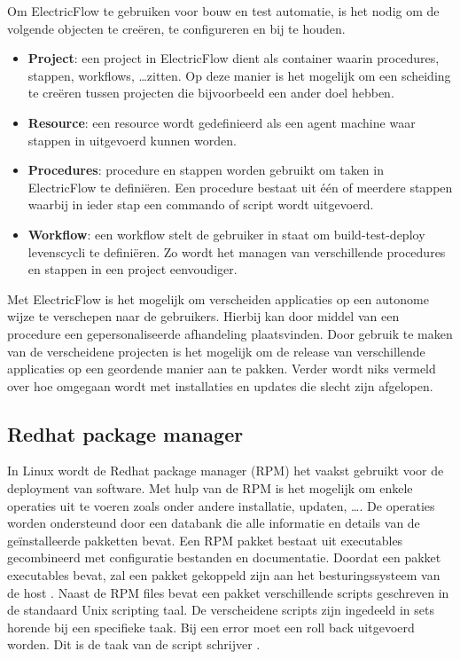 Om ElectricFlow te gebruiken voor bouw en test automatie, is het nodig om de volgende objecten te creëren, te configureren en bij te houden.
\begin{itemize}
\item \textbf{Project}: een project in ElectricFlow dient als container waarin procedures, stappen, workflows, \ldots zitten.
Op deze manier is het mogelijk om een scheiding te creëren tussen projecten die bijvoorbeeld een ander doel hebben.
\item \textbf{Resource}: een resource wordt gedefinieerd als een agent machine waar stappen in uitgevoerd kunnen worden.
\item \textbf{Procedures}: procedure en stappen worden gebruikt om taken in ElectricFlow te definiëren.
Een procedure bestaat uit één of meerdere stappen waarbij in ieder stap een commando of script wordt uitgevoerd.
\item \textbf{Workflow}: een workflow stelt de gebruiker in staat om build-test-deploy levenscycli te definiëren.
Zo wordt het managen van verschillende procedures en stappen in een project eenvoudiger.
\end{itemize}

Met ElectricFlow is het mogelijk om verscheiden applicaties op een autonome wijze te verschepen naar de gebruikers.
Hierbij kan door middel van een procedure een gepersonaliseerde afhandeling plaatsvinden.
Door gebruik te maken van de verscheidene projecten is het mogelijk om de release van verschillende applicaties op een geordende manier aan te pakken. 
Verder wordt niks vermeld over hoe omgegaan wordt met installaties en updates die slecht zijn afgelopen.

\subsection{Redhat package manager}
In Linux wordt de Redhat package manager (RPM) het vaakst gebruikt voor de deployment van software.
Met hulp van de RPM is het mogelijk om enkele operaties uit te voeren zoals onder andere installatie, updaten, \ldots .
De operaties worden ondersteund door een databank die alle informatie en details van de geïnstalleerde pakketten bevat.
Een RPM pakket bestaat uit executables gecombineerd met configuratie bestanden en documentatie.
Doordat een pakket executables bevat, zal een pakket gekoppeld zijn aan het besturingssysteem van de host \citep{bailey1997maximum}.
Naast de RPM files bevat een pakket verschillende scripts geschreven in de standaard Unix scripting taal.
De verscheidene scripts zijn ingedeeld in sets horende bij een specifieke taak.
Bij een error moet een roll back uitgevoerd worden.
Dit is de taak van de script schrijver \citep{softwareDeployment}.

